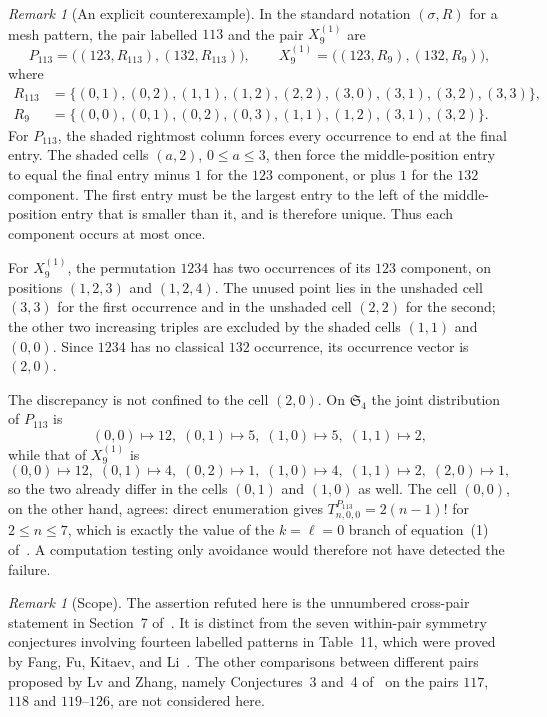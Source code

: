 \documentclass[11pt]{amsart}
\theoremstyle{plain}
\theoremstyle{remark}
\newtheorem{remark}[theorem]{Remark}
\begin{document}
\begin{remark}[An explicit counterexample]
In the standard notation $(\sigma,R)$ for a mesh pattern, the pair
labelled $113$ and the pair $X_9^{(1)}$ are
\[
P_{113}
=
\bigl((123,R_{113}),(132,R_{113})\bigr),
\qquad
X_9^{(1)}
=
\bigl((123,R_9),(132,R_9)\bigr),
\]
where
\begin{align*}
R_{113}
&=
\{(0,1),(0,2),(1,1),(1,2),(2,2),
  (3,0),(3,1),(3,2),(3,3)\},\\
R_9
&=
\{(0,0),(0,1),(0,2),(0,3),
  (1,1),(1,2),(3,1),(3,2)\}.
\end{align*}
For $P_{113}$, the shaded rightmost column forces every occurrence
to end at the final entry. The shaded cells $(a,2)$,
$0\le a\le3$, then force the middle-position entry to equal the
final entry minus $1$ for the $123$ component, or plus $1$ for the
$132$ component. The first entry must be the largest entry to the
left of the middle-position entry that is smaller than it, and is
therefore unique. Thus each component occurs at most once.

For $X_9^{(1)}$, the permutation $1234$ has two occurrences of its
$123$ component, on positions $(1,2,3)$ and $(1,2,4)$. The unused
point lies in the unshaded cell $(3,3)$ for the first occurrence and
in the unshaded cell $(2,2)$ for the second; the other two increasing
triples are excluded by the shaded cells $(1,1)$ and $(0,0)$. Since
$1234$ has no classical $132$ occurrence, its occurrence vector is
$(2,0)$.

The discrepancy is not confined to the cell $(2,0)$. On
$\mathfrak S_4$ the joint distribution of $P_{113}$ is
\[
(0,0)\mapsto12,\;
(0,1)\mapsto5,\;
(1,0)\mapsto5,\;
(1,1)\mapsto2,
\]
while that of $X_9^{(1)}$ is
\[
(0,0)\mapsto12,\;
(0,1)\mapsto4,\;
(0,2)\mapsto1,\;
(1,0)\mapsto4,\;
(1,1)\mapsto2,\;
(2,0)\mapsto1,
\]
so the two already differ in the cells $(0,1)$ and $(1,0)$ as well.
The cell $(0,0)$, on the other hand, agrees: direct enumeration gives
$T^{P_{113}}_{n,0,0}=2(n-1)!$ for $2\le n\le7$, which is exactly the
value of the $k=\ell=0$ branch of equation~(1) of~\cite{LvZhang}. A
computation testing only avoidance would therefore not have detected
the failure.
\end{remark}

\begin{remark}[Scope]
The assertion refuted here is the unnumbered cross-pair statement in
Section~7 of~\cite{LvZhang}. It is distinct from the seven within-pair
symmetry conjectures involving fourteen labelled patterns in
Table~11, which were proved by Fang, Fu, Kitaev, and
Li~\cite{FangFuKitaevLi}. The other comparisons between different
pairs proposed by Lv and Zhang, namely Conjectures~3 and~4
of~\cite{LvZhang} on the pairs $117$, $118$ and $119$--$126$, are not
considered here.
\end{remark}
\end{document}

